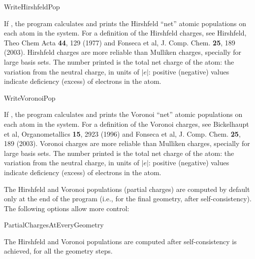 \begin{fdflogicalF}{WriteHirshfeldPop}

  If \fdftrue, the program calculates and prints the Hirshfeld ``net''
  atomic populations on each atom in the system. For a definition of
  the Hirshfeld charges, see Hirshfeld, Theo Chem Acta \textbf{44},
  129 (1977) and Fonseca et al, J. Comp. Chem. \textbf{25}, 189
  (2003).  Hirshfeld charges are more reliable than Mulliken charges,
  specially for large basis sets.  The number printed is the total net
  charge of the atom: the variation from the neutral charge, in units
  of $|e|$: positive (negative) values indicate deficiency (excess) of
  electrons in the atom.

\end{fdflogicalF}

\begin{fdflogicalF}{WriteVoronoiPop}

  If \fdftrue, the program calculates and prints the Voronoi ``net''
  atomic populations on each atom in the system. For a definition of
  the Voronoi charges, see Bickelhaupt et al, Organometallics
  \textbf{15}, 2923 (1996) and Fonseca et al,
  J. Comp. Chem. \textbf{25}, 189 (2003).  Voronoi charges are more
  reliable than Mulliken charges, specially for large basis sets.  The
  number printed is the total net charge of the atom: the variation
  from the neutral charge, in units of $|e|$: positive (negative)
  values indicate deficiency (excess) of electrons in the atom.

\end{fdflogicalF}

The Hirshfeld and Voronoi populations (partial charges) are computed
by default only at the end of the program (i.e., for the final
geometry, after self-consistency). The following options allow more
control:

\begin{fdflogicalF}{PartialChargesAtEveryGeometry}

  The Hirshfeld and Voronoi populations are computed after
  self-consistency is achieved, for all the geometry steps.

\end{fdflogicalF}


